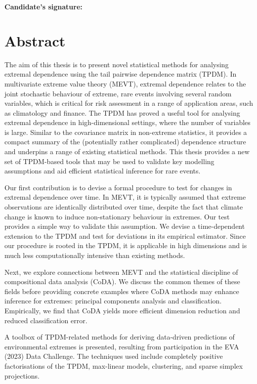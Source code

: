 \vspace{2em} 
\textbf{Candidate's signature:} \dotfill

\newpage

\chapter*{Abstract}

\doublespacing

The aim of this thesis is to present novel statistical methods for analysing extremal dependence using the tail pairwise dependence matrix (TPDM).
In multivariate extreme value theory (MEVT), extremal dependence relates to the joint stochastic behaviour of extreme, rare events involving several random variables, which is critical for risk assessment in a range of application areas, such as climatology and finance. 
The TPDM has proved a useful tool for analysing extremal dependence in high-dimensional settings, where the number of variables is large.
Similar to the covariance matrix in non-extreme statistics, it provides a compact summary of the (potentially rather complicated) dependence structure and underpins a range of existing statistical methods.
This thesis provides a new set of TPDM-based tools that may be used to validate key modelling assumptions and aid efficient statistical inference for rare events.

Our first contribution is to devise a formal procedure to test for changes in extremal dependence over time. 
In MEVT, it is typically assumed that extreme observations are identically distributed over time, despite the fact that climate change is known to induce non-stationary behaviour in extremes.
Our test provides a simple way to validate this assumption.
We devise a time-dependent extension to the TPDM and test for deviations in its empirical estimator.
Since our procedure is rooted in the TPDM, it is applicable in high dimensions and is much less computationally intensive than existing methods.

Next, we explore connections between MEVT and the statistical discipline of compositional data analysis (CoDA). 
We discuss the common themes of these fields before providing concrete examples where CoDA methods may enhance inference for extremes: principal components analysis and classification. 
Empirically, we find that CoDA yields more efficient dimension reduction and reduced classification error.

A toolbox of TPDM-related methods for deriving data-driven predictions of environmental extremes is presented, resulting from participation in the EVA (2023) Data Challenge. 
The techniques used include completely positive factorisations of the TPDM, max-linear models, clustering, and sparse simplex projections.

